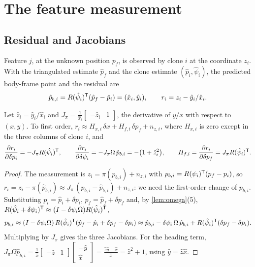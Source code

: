 \section{The feature measurement}

\subsection{Residual and Jacobians}

Feature $j$, at the unknown position $p_f$, is observed by clone $i$ at the coordinate $z_i$. With the triangulated estimate $\hat p_f$ and
the clone estimate $(\hat p_i, \hat\psi_i)$, the predicted body-frame point and the residual are
\begin{equation}
  \hat p_{b,i} = R(\hat\psi_i)^{\mathsf{T}}(\hat p_f - \hat p_i) = (\hat x_i, \hat y_i), \qquad r_i = z_i - \hat y_i/\hat x_i .
\end{equation}

\begin{proposition}
\label{prop:planar-H}
Let $\hat z_i = \hat y_i/\hat x_i$ and $J_\pi = \frac{1}{\hat x_i}\begin{bmatrix} -\hat z_i & 1\end{bmatrix}$, the derivative of $y/x$ with respect to $(x, y)$.
To first order, $r_i \approx H_{x,i}\,\delta x + H_{f,i}\,\delta p_f + n_{z,i}$, where $H_{x,i}$ is zero except in the three columns of clone $i$, and
\begin{equation}
  \frac{\partial r_i}{\partial\delta p_i} = -J_\pi R(\hat\psi_i)^{\mathsf{T}}, \qquad
  \frac{\partial r_i}{\partial\delta\psi_i} = -J_\pi\Omega\,\hat p_{b,i} = -\big(1 + \hat z_i^2\big), \qquad
  H_{f,i} = \frac{\partial r_i}{\partial\delta p_f} = J_\pi R(\hat\psi_i)^{\mathsf{T}} .
  \label{eq:planar-H}
\end{equation}
\end{proposition}
\begin{proof}
The measurement is $z_i = \pi(p_{b,i}) + n_{z,i}$ with $p_{b,i} = R(\psi_i)^{\mathsf{T}}(p_f - p_i)$, so $r_i = z_i - \pi(\hat p_{b,i}) \approx J_\pi\,(p_{b,i} - \hat p_{b,i}) + n_{z,i}$:
we need the first-order change of $p_{b,i}$. Substituting $p_i = \hat p_i + \delta p_i$, $p_f = \hat p_f + \delta p_f$ and, by \cref{lem:omega}(5),
$R(\hat\psi_i + \delta\psi_i)^{\mathsf{T}} \approx (I - \delta\psi_i\Omega)R(\hat\psi_i)^{\mathsf{T}}$,
\begin{equation*}
  p_{b,i} \approx (I - \delta\psi_i\Omega)\,R(\hat\psi_i)^{\mathsf{T}}(\hat p_f - \hat p_i + \delta p_f - \delta p_i)
  \approx \hat p_{b,i} - \delta\psi_i\,\Omega\,\hat p_{b,i} + R(\hat\psi_i)^{\mathsf{T}}(\delta p_f - \delta p_i).
\end{equation*}
Multiplying by $J_\pi$ gives the three Jacobians. For the heading term,
$J_\pi\Omega\hat p_{b,i} = \frac{1}{\hat x}\begin{bmatrix} -\hat z & 1\end{bmatrix}\begin{bmatrix} -\hat y \\ \hat x\end{bmatrix} = \frac{\hat z\hat y + \hat x}{\hat x} = \hat z^2 + 1$,
using $\hat y = \hat z\hat x$.
\end{proof}

